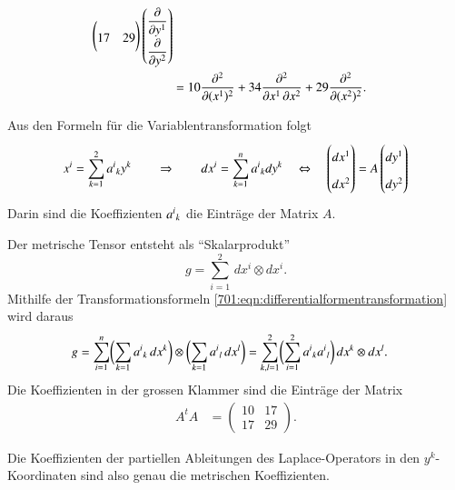 \begin{loesung}
\begin{teilaufgaben}
\begin{align*}
\begin{pmatrix}
17&29
\end{pmatrix}
\bgroup
\renewcommand{\arraystretch}{1.8}
\begin{pmatrix}
\displaystyle \frac{\partial }{\partial y^1}\\
\displaystyle \frac{\partial }{\partial y^2}
\end{pmatrix}
\egroup
\\
&=
10\frac{\partial^2}{\partial (x^1)^2}
+
34\frac{\partial^2}{\partial x^1\,\partial x^2}
+
29\frac{\partial^2}{\partial (x^2)^2}.
\end{align*}
\item
Aus den Formeln für die Variablentransformation folgt
\begin{equation}
x^i = \sum_{k=1}^2 a^i\mathstrut_k y^k
\qquad\Rightarrow\qquad
dx^i
=
\sum_{k=1}^n a^i\mathstrut_k dy^k
\quad
\Leftrightarrow
\quad
\begin{pmatrix}dx^1\\dx^2\end{pmatrix}
=
A
\begin{pmatrix}dy^1\\dy^2\end{pmatrix}
\label{701:eqn:differentialformentransformation}
\end{equation}
Darin sind die Koeffizienten $a^i\mathstrut_k$ die Einträge der Matrix $A$.
\item
Der metrische Tensor entsteht als ``Skalarprodukt'' 
\[
g
=
\sum_{i=1}^2\, dx^i\otimes dx^i.
\]
Mithilfe der Transformationsformeln
\eqref{701:eqn:differentialformentransformation}
wird daraus
\begin{align*}
g
&=
\sum_{i=1}^n
\biggl(\sum_{k=1} a^i\mathstrut_k\,dx^k\biggr)
\otimes
\biggl(\sum_{k=1} a^i\mathstrut_l\,dx^l\biggr)
=
\sum_{k,l=1}^2
\biggl(
\sum_{i=1}^2
a^i\mathstrut_k
a^i\mathstrut_l
\biggr)
\,
dx^k\otimes dx^l.
\end{align*}
Die Koeffizienten in der grossen Klammer sind die Einträge der Matrix
\begin{align*}
A^tA
&=
\begin{pmatrix}
10&17\\
17&29
\end{pmatrix}.
\end{align*}
\item
Die Koeffizienten der partiellen Ableitungen des Laplace-Operators
in den $y^k$-Koor\-dinaten sind also genau die metrischen Koeffizienten.
\qedhere
\end{teilaufgaben}
\end{loesung}
